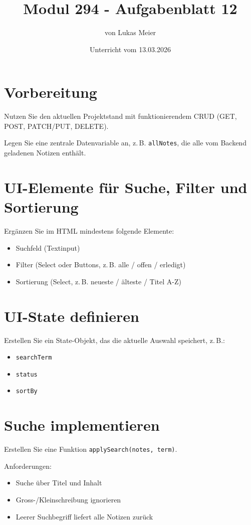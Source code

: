 \documentclass[a4paper,12pt]{article}
\title{Modul 294 - Aufgabenblatt 12}
\author{von Lukas Meier}
\date{Unterricht vom 13.03.2026}
\begin{document}
\maketitle

\section{Vorbereitung}

Nutzen Sie den aktuellen Projektstand mit funktionierendem CRUD (GET, POST, PATCH/PUT, DELETE).

Legen Sie eine zentrale Datenvariable an, z.\,B. \texttt{allNotes}, die alle vom Backend geladenen Notizen enthält.

\section{UI-Elemente für Suche, Filter und Sortierung}

Ergänzen Sie im HTML mindestens folgende Elemente:
\begin{itemize}
    \item Suchfeld (Textinput)
    \item Filter (Select oder Buttons, z.\,B. alle / offen / erledigt)
    \item Sortierung (Select, z.\,B. neueste / älteste / Titel A-Z)
\end{itemize}

\section{UI-State definieren}

Erstellen Sie ein State-Objekt, das die aktuelle Auswahl speichert, z.\,B.:
\begin{itemize}
    \item \texttt{searchTerm}
    \item \texttt{status}
    \item \texttt{sortBy}
\end{itemize}

\section{Suche implementieren}

Erstellen Sie eine Funktion \texttt{applySearch(notes, term)}.

Anforderungen:
\begin{itemize}
    \item Suche über Titel und Inhalt
    \item Gross-/Kleinschreibung ignorieren
    \item Leerer Suchbegriff liefert alle Notizen zurück
\end{itemize}
\end{document}
